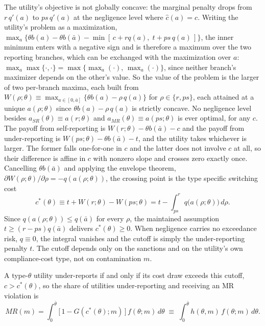 \documentclass[12pt]{article}
\begin{document}
	The utility's objective is not globally concave: the marginal penalty drops from $r\,q'(a)$ to $ps\,q'(a)$ at the negligence level where $\hat{c}(a) = c$. Writing the utility's problem as a maximization, $\max_a\{\theta b(a) - \theta b(\bar a) - \min[\,c + r q(a),\; t + ps\,q(a)\,]\}$, the inner minimum enters with a negative sign and is therefore a maximum over the two reporting branches, which can be exchanged with the maximization over $a$: $\max_a \max\{\cdot,\cdot\} = \max\{\max_a(\cdot),\, \max_a(\cdot)\}$, since neither branch's maximizer depends on the other's value. So the value of the problem is the larger of two per-branch maxima, each built from $W(\rho;\theta) \equiv \max_{a \in [0,\bar{a}]} \{\theta b(a) - \rho\, q(a)\}$ for $\rho \in \{r, ps\}$, each attained at a unique $a(\rho;\theta)$ since $\theta b(a) - \rho\, q(a)$ is strictly concave. No negligence level besides $a_{SR}(\theta) \equiv a(r;\theta)$ and $a_{MR}(\theta) \equiv a(ps;\theta)$ is ever optimal, for any $c$. The payoff from self-reporting is $W(r;\theta) - \theta b(\bar{a}) - c$ and the payoff from under-reporting is $W(ps;\theta) - \theta b(\bar{a}) - t$, and the utility takes whichever is larger. The former falls one-for-one in $c$ and the latter does not involve $c$ at all, so their difference is affine in $c$ with nonzero slope and crosses zero exactly once. Cancelling $\theta b(\bar{a})$ and applying the envelope theorem, $\partial W(\rho;\theta)/\partial\rho = -q(a(\rho;\theta))$, the crossing point is the type specific switching cost
	\begin{equation}\label{eq:cstar}
		c^*(\theta) \equiv t + W(r;\theta) - W(ps;\theta) = t - \int_{ps}^{r} q\big(a(\rho;\theta)\big)\, d\rho.
	\end{equation}
	Since $q(a(\rho;\theta)) \le q(\bar{a})$ for every $\rho$, the maintained assumption $t \ge (r-ps)q(\bar{a})$ delivers $c^*(\theta) \ge 0$. When negligence carries no exceedance risk, $q \equiv 0$, the integral vanishes and the cutoff is simply the under-reporting penalty $t$. The cutoff depends only on the sanctions and on the utility's own compliance-cost type, not on contamination $m$.

	A type-$\theta$ utility under-reports if and only if its cost draw exceeds this cutoff, $c > c^*(\theta)$, so the share of utilities under-reporting and receiving an MR violation is
	\begin{equation}\label{eq:MRm}
		MR(m) = \int_0^{\bar\theta} \big[\,1 - G(c^*(\theta);m)\,\big]\, f(\theta;m)\, d\theta \;\equiv\; \int_0^{\bar\theta} h(\theta,m)\, f(\theta;m)\, d\theta.
	\end{equation}
	
\end{document}
